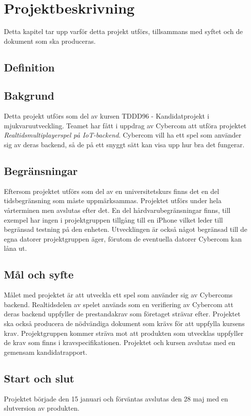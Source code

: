 \section{Projektbeskrivning}

Detta kapitel tar upp varför detta projekt utförs, tillsammans med syftet och de dokument som ska produceras.

\subsection{Definition}
\begin{itemize}[leftmargin=5cm]
\end{itemize}


\subsection{Bakgrund}
Detta projekt utförs som del av kursen TDDD96 - Kandidatprojekt i mjukvaruutveckling. Teamet har fått i uppdrag av Cybercom att utföra projektet \textit{Realtidsmultiplayerspel på IoT-backend}. Cybercom vill ha ett spel som använder sig av deras backend, så de på ett snyggt sätt kan visa upp hur bra det fungerar.

\subsection{Begränsningar}
Eftersom projektet utförs som del av en universitetskurs finns det en del tidsbegränsning som måste uppmärksammas. Projektet utförs under hela vårterminen men avslutas efter det. En del hårdvarubegränsningar finns, till exempel har ingen i projektgruppen tillgång till en iPhone vilket leder till begränsad testning på den enheten. Utvecklingen är också något begränsad till de egna datorer projektgruppen äger, förutom de eventuella datorer Cybercom kan låna ut.

\subsection{Mål och syfte}
Målet med projektet är att utveckla ett spel som använder sig av Cybercoms backend. Realtidsdelen av spelet används som en verifiering av Cybercom att deras backend uppfyller de prestandakrav som företaget strävar efter. Projektet ska också producera de nödvändiga dokument som krävs för att uppfylla kursens krav\cite{bib-tddd96}. Projektgruppen kommer sträva mot att produkten som utvecklas uppfyller de krav som finns i kravspecifikationen\cite{bib-kravspec}. Projektet och kursen avslutas med en gemensam kandidatrapport.



\subsection{Start och slut}
Projektet började den 15 januari och förväntas avslutas den 28 maj med en slutversion av produkten.

\pagebreak

